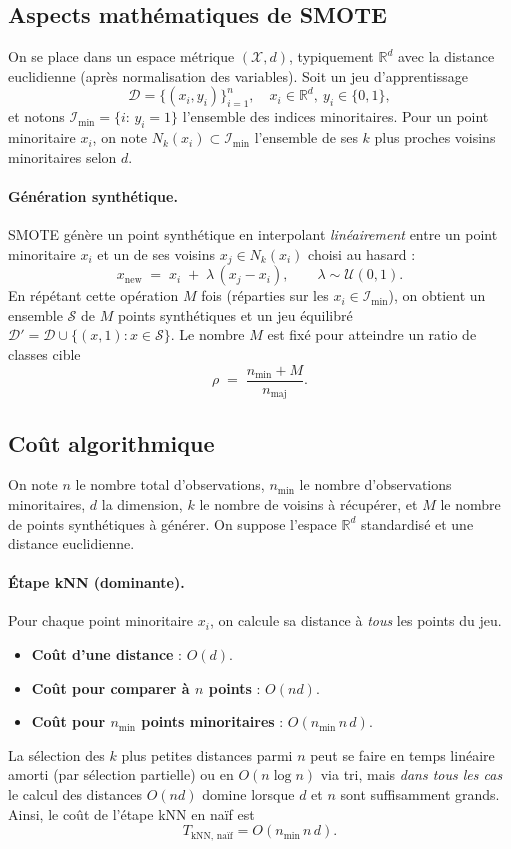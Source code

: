 \documentclass{article}
\begin{document}
\subsection{Aspects mathématiques de SMOTE}

On se place dans un espace métrique $(\mathcal{X}, d)$, typiquement $\mathbb{R}^d$ avec la distance euclidienne (après normalisation des variables). Soit un jeu d'apprentissage
\[
\mathcal{D}=\{(x_i,y_i)\}_{i=1}^n,\quad x_i\in\mathbb{R}^d,\ y_i\in\{0,1\},
\]
et notons $\mathcal{I}_{\text{min}}=\{i:\,y_i=1\}$ l’ensemble des indices minoritaires. Pour un point minoritaire $x_i$, on note $N_k(x_i)\subset\mathcal{I}_{\text{min}}$ l’ensemble de ses $k$ plus proches voisins minoritaires selon $d$.

\paragraph{Génération synthétique.} SMOTE génère un point synthétique en interpolant \emph{linéairement} entre un point minoritaire $x_i$ et un de ses voisins $x_j\in N_k(x_i)$ choisi au hasard :
\[
x_{\text{new}} \;=\; x_i \;+\; \lambda\,(x_j - x_i),
\qquad \lambda \sim \mathcal{U}(0,1).
\]
En répétant cette opération $M$ fois (réparties sur les $x_i\in\mathcal{I}_{\text{min}}$), on obtient un ensemble $\mathcal{S}$ de $M$ points synthétiques et un jeu équilibré $\mathcal{D}'=\mathcal{D}\cup\{(x,1):x\in\mathcal{S}\}$. Le nombre $M$ est fixé pour atteindre un ratio de classes cible
\[
\rho \;=\; \frac{n_{\text{min}} + M}{n_{\text{maj}}}.
\]

\subsection{Coût algorithmique}

On note $n$ le nombre total d'observations, $n_{\text{min}}$ le nombre d'observations minoritaires,
$d$ la dimension, $k$ le nombre de voisins à récupérer, et $M$ le nombre de points synthétiques à générer.
On suppose l’espace $\mathbb{R}^d$ standardisé et une distance euclidienne.

\paragraph{Étape kNN (dominante).}
Pour chaque point minoritaire $x_i$, on calcule sa distance à \emph{tous} les points du jeu.
\begin{itemize}
  \item \textbf{Coût d'une distance} : $O(d)$.
  \item \textbf{Coût pour comparer à $n$ points} : $O(nd)$.
  \item \textbf{Coût pour $n_{\text{min}}$ points minoritaires} : $O(n_{\text{min}}\,n\,d)$.
\end{itemize}
La sélection des $k$ plus petites distances parmi $n$ peut se faire en temps linéaire amorti
(par sélection partielle) ou en $O(n\log n)$ via tri, mais \emph{dans tous les cas} le calcul des distances
$O(nd)$ domine lorsque $d$ et $n$ sont suffisamment grands. Ainsi, le coût de l’étape kNN en naïf est
\[
T_{\text{kNN, naïf}} = O(n_{\text{min}}\,n\,d).
\]
\end{document}
